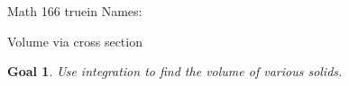 \documentclass[12pt]{article}
\newtheorem*{goal}{Goal}
\begin{document}
\pagestyle{empty} %

\noindent
{Math 166  truein  Names:\ \hrulefill}

\noindent
{Volume via cross section}

\medskip

\begin{goal} \rm
Use integration to find the volume of various solids.
\end{goal}


\end{document}
